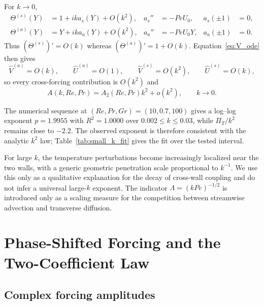 \documentclass[12pt,a4paper]{article}
\newcommand{\Rey}{\mathit{Re}}
\newcommand{\Pe}{\mathit{Pe}}
\newcommand{\Grr}{\mathit{Gr}}
\renewcommand{\Pr}{\mathit{Pr}}
\newcommand{\PiT}{\Pi_T}
\begin{document}
For $k\to0$,
\begin{align}
  \Theta^{(s)}(Y)&=1+ik a_s(Y)+O(k^2), & a_s''&=-\Pe U_0, & a_s(\pm1)&=0,\\
  \Theta^{(a)}(Y)&=Y+ik a_a(Y)+O(k^2), & a_a''&=-\Pe U_0Y, & a_a(\pm1)&=0.
\end{align}
Thus $(\Theta^{(s)})'=O(k)$ whereas $(\Theta^{(a)})'=1+O(k)$. Equation~\eqref{eq:V_ode} then gives
\begin{equation}
  \widehat V^{(a)}=O(k),\qquad \widehat U^{(a)}=O(1),\qquad
  \widehat V^{(s)}=O(k^2),\qquad \widehat U^{(s)}=O(k),
\end{equation}
so every cross-forcing contribution is $O(k^2)$ and
\begin{equation}
  A(k,\Rey,\Pr)=A_2(\Rey,\Pr)k^2+o(k^2),\qquad k\to0.
  \label{eq:small_k}
\end{equation}

The numerical sequence at $(\Rey,\Pr,\Grr)=(10,0.7,100)$ gives a log--log exponent
$p=1.9955$ with $R^2=1.0000$ over $0.002\le k\le0.03$, while $\PiT/k^2$ remains close to
$-2.2$. The observed exponent is therefore consistent with the analytic $k^2$ law;
Table~\ref{tab:small_k_fit} gives the fit over the tested interval.

For large $k$, the temperature perturbations become increasingly localized near the two walls, with a
generic geometric penetration scale proportional to $k^{-1}$. We use this only as a qualitative explanation
for the decay of cross-wall coupling and do not infer a universal large-$k$ exponent. The indicator
$\Lambda=(k\Pe)^{-1/2}$ is introduced only as a scaling measure for the competition between streamwise
advection and transverse diffusion.

\section{Phase-Shifted Forcing and the Two-Coefficient Law}
\label{sec:phase}

\subsection{Complex forcing amplitudes}
\end{document}
